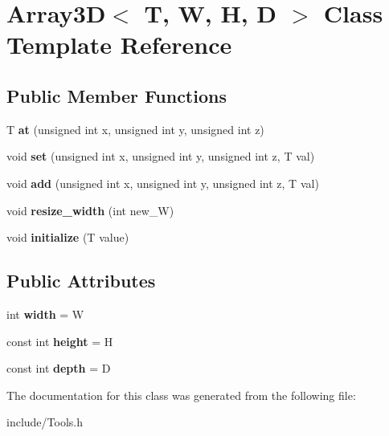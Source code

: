 \hypertarget{class_array3_d}{}\section{Array3D$<$ T, W, H, D $>$ Class Template Reference}
\label{class_array3_d}
\subsection*{Public Member Functions}
\begin{DoxyCompactItemize}
\item 
\mbox{\label{class_array3_d_a3662f888234f31da9cd4332298dec1b6}} 
T {\bfseries at} (unsigned int x, unsigned int y, unsigned int z)
\item 
\mbox{\label{class_array3_d_ace9dd0a17946bfa020cbdd8cd87c0014}} 
void {\bfseries set} (unsigned int x, unsigned int y, unsigned int z, T val)
\item 
\mbox{\label{class_array3_d_abac6f45b39796dde7af04c6f1bf81e51}} 
void {\bfseries add} (unsigned int x, unsigned int y, unsigned int z, T val)
\item 
\mbox{\label{class_array3_d_a9489d84e04fb8273a5c52d787b09544e}} 
void {\bfseries resize\+\_\+width} (int new\+\_\+W)
\item 
\mbox{\label{class_array3_d_af82938187800cec6bfeb85d67caf061e}} 
void {\bfseries initialize} (T value)
\end{DoxyCompactItemize}
\subsection*{Public Attributes}
\begin{DoxyCompactItemize}
\item 
\mbox{\label{class_array3_d_a761192dd39b8e206a70808694a8312ae}} 
int {\bfseries width} = W
\item 
\mbox{\label{class_array3_d_aa3ff658aa5dbd5e8f7ccd14e5bf46831}} 
const int {\bfseries height} = H
\item 
\mbox{\label{class_array3_d_a5b36c780deaa0fe524b60c4edfeb8bf7}} 
const int {\bfseries depth} = D
\end{DoxyCompactItemize}


The documentation for this class was generated from the following file\+:\begin{DoxyCompactItemize}
\item 
include/Tools.\+h\end{DoxyCompactItemize}
